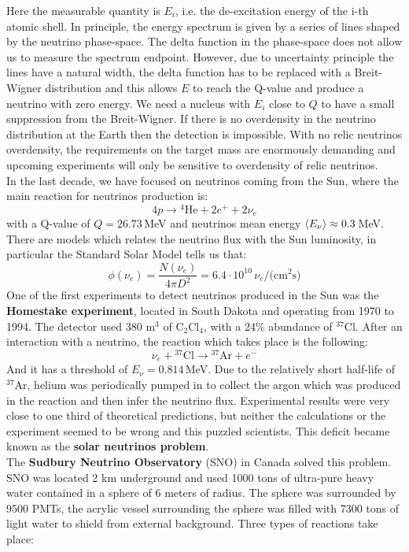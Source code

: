 \documentclass[10.75pt,a4paper,openright,bottom=2cm]{article}
\begin{document}
Here the measurable quantity is $E_i$, i.e. the de-excitation energy of the i-th atomic shell. In principle, the energy spectrum is given by a series of lines shaped by the neutrino phase-space. The delta function in the phase-space does not allow us to measure the spectrum endpoint. However, due to uncertainty principle the lines have a natural width, the delta function has to be replaced with a Breit-Wigner distribution and this allows $E$ to reach the Q-value and produce a neutrino with zero energy. We need a nucleus with $E_i$ close to $Q$ to have a small suppression from the Breit-Wigner. If there is no overdensity in the neutrino distribution at the Earth then the detection is impossible. With no relic neutrinos overdensity, the requirements on the target mass are enormously demanding and upcoming experiments will only be sensitive to overdensity of relic neutrinos.\\
In the last decade, we have focused on neutrinos coming from the Sun, where the main reaction for neutrinos production is:
\[
4p\to\text{$^4$He}+2e^++2\nu_e
\]
with a Q-value of $Q=26.73$\,MeV and neutrinos mean energy $\Braket{E_\nu}\approx0.3$\,MeV. There are models which relates the neutrino flux with the Sun luminosity, in particular the Standard Solar Model tells us that:
\[
\phi(\nu_e)=\frac{N(\nu_e)}{4\pi D^2}=6.4\cdot10^{10}\,\nu_e/\text{(cm$^2$s)}
\]
One of the first experiments to detect neutrinos produced in the Sun was the \textbf{Homestake experiment}, located in South Dakota and operating from 1970 to 1994. The detector used 380 m$^3$ of C$_2$Cl$_4$, with a 24\% abundance of $^{37}$Cl. After an interaction with a neutrino, the reaction which takes place is the following:
\[
\nu_e+\text{$^{37}$Cl}\to\text{$^{37}$Ar}+e^-
\]
And it has a threshold of $E_\nu=0.814$\,MeV. Due to the relatively short half-life of $^{37}$Ar, helium was periodically pumped in to collect the argon which was produced in the reaction and then infer the neutrino flux. Experimental results were very close to one third of theoretical predictions, but neither the calculations or the experiment seemed to be wrong and this puzzled scientists. This deficit became known as the \textbf{solar neutrinos problem}.\\
The \textbf{Sudbury Neutrino Observatory} (SNO) in Canada solved this problem. SNO was located 2 km underground and used 1000 tons of ultra-pure heavy water contained in a sphere of 6 meters of radius. The sphere was surrounded by 9500 PMTs, the acrylic vessel surrounding the sphere was filled with 7300 tons of light water to shield from external background. Three types of reactions take place:
\end{document}
